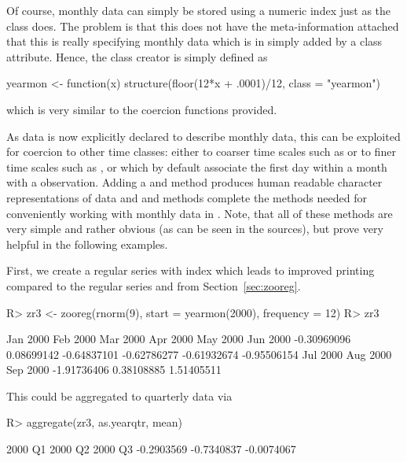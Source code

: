 \documentclass{Z}
\begin{document}
Of course, monthly data can simply be stored using a numeric index just
as the class  does. The problem is that this does not have the meta-information
attached that this is really specifying monthly data which is in 
simply added by a class attribute. Hence, the class creator is simply defined as

\begin{Scode}
yearmon <- function(x) structure(floor(12*x + .0001)/12, class = "yearmon")
\end{Scode}

which is very similar to the  coercion functions provided.

As  data is now explicitly declared to describe monthly data,
this can be exploited for coercion to other time classes: either to coarser time scales
such as  or to finer time scales such as
,  or  which by default associate the first day
within a month with a  observation. Adding a 
and  method produces human readable character representations
of  data and  and  methods complete the
methods needed for conveniently  working with monthly data in . Note,
that all of these methods are  very simple and rather obvious (as can be seen in
the  sources), but prove very helpful in the following examples.

First, we create a regular series  with  index which
leads to improved printing compared to the regular series  and 
from Section~\ref{sec:zooreg}.

\begin{Schunk}
\begin{Sinput}
R> zr3 <- zooreg(rnorm(9), start = yearmon(2000), frequency = 12)
R> zr3
\end{Sinput}
\begin{Soutput}
   Jan 2000    Feb 2000    Mar 2000    Apr 2000    May 2000    Jun 2000 
-0.30969096  0.08699142 -0.64837101 -0.62786277 -0.61932674 -0.95506154 
   Jul 2000    Aug 2000    Sep 2000 
-1.91736406  0.38108885  1.51405511 
\end{Soutput}
\end{Schunk}

This could be aggregated to quarterly data via

\begin{Schunk}
\begin{Sinput}
R> aggregate(zr3, as.yearqtr, mean)
\end{Sinput}
\begin{Soutput}
   2000 Q1    2000 Q2    2000 Q3 
-0.2903569 -0.7340837 -0.0074067 
\end{Soutput}
\end{Schunk}
\end{document}
